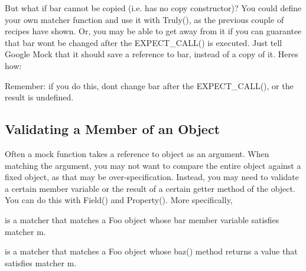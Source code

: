 But what if {\ttfamily bar} cannot be copied (i.\+e. has no copy constructor)? You could define your own matcher function and use it with {\ttfamily Truly()}, as the previous couple of recipes have shown. Or, you may be able to get away from it if you can guarantee that {\ttfamily bar} won\textquotesingle{}t be changed after the {\ttfamily E\+X\+P\+E\+C\+T\+\_\+\+C\+A\+L\+L()} is executed. Just tell Google Mock that it should save a reference to {\ttfamily bar}, instead of a copy of it. Here\textquotesingle{}s how\+:


\begin{DoxyCode}{0}
\DoxyCodeLine{}
\end{DoxyCode}


Remember\+: if you do this, don\textquotesingle{}t change {\ttfamily bar} after the {\ttfamily E\+X\+P\+E\+C\+T\+\_\+\+C\+A\+L\+L()}, or the result is undefined.

\subsection*{Validating a Member of an Object}

Often a mock function takes a reference to object as an argument. When matching the argument, you may not want to compare the entire object against a fixed object, as that may be over-\/specification. Instead, you may need to validate a certain member variable or the result of a certain getter method of the object. You can do this with {\ttfamily Field()} and {\ttfamily Property()}. More specifically,


\begin{DoxyCode}{0}
\end{DoxyCode}


is a matcher that matches a {\ttfamily Foo} object whose {\ttfamily bar} member variable satisfies matcher {\ttfamily m}.


\begin{DoxyCode}{0}
\end{DoxyCode}


is a matcher that matches a {\ttfamily Foo} object whose {\ttfamily baz()} method returns a value that satisfies matcher {\ttfamily m}.

